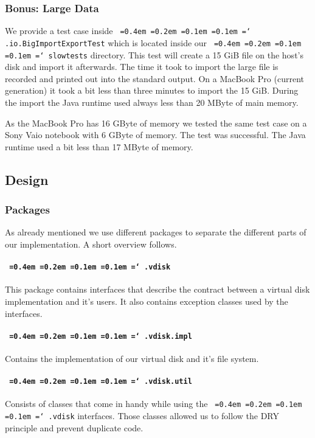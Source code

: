 \documentclass[a4paper,12pt]{article}
\newcommand*\justify{%
  \fontdimen2\font=0.4em%
  \fontdimen3\font=0.2em%
  \fontdimen4\font=0.1em%
  \fontdimen7\font=0.1em%
  \hyphenchar\font=`\-%
}
\newcommand{\package}[1]{\texttt{\justify #1}}
\begin{document}
\subsubsection{Bonus: Large Data}
We provide a test case inside \package{.io.BigImportExportTest} which is located inside our \package{slowtests} directory. This test will create a 15 GiB file on the host's disk and import it afterwards. The time it took to import the large file is recorded and printed out into the standard output. On a MacBook Pro (current generation) it took a bit less than three minutes to import the 15 GiB. During the import the Java runtime used always less than 20 MByte of main memory.

As the MacBook Pro has 16 GByte of memory we tested the same test case on a Sony Vaio notebook with 6 GByte of memory. The test was successful. The Java runtime used a bit less than 17 MByte of memory.

\subsection{Design}

\subsubsection{Packages}
As already mentioned we use different packages to separate the different parts of our implementation. A short overview follows.

\paragraph{\package{.vdisk}}
This package contains interfaces that describe the contract between a virtual disk implementation and it's users. It also contains exception classes used by the interfaces.

\paragraph{\package{.vdisk.impl}}
Contains the implementation of our virtual disk and it's file system.

\paragraph{\package{.vdisk.util}}
Consists of classes that come in handy while using the \package{.vdisk} interfaces. Those classes allowed us to follow the DRY principle and prevent duplicate code.
\end{document}
